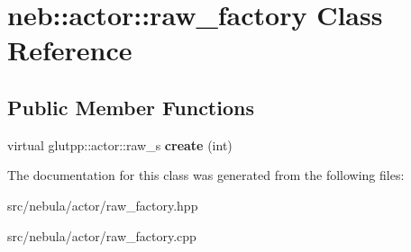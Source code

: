 \hypertarget{classneb_1_1actor_1_1raw__factory}{\section{neb\-:\-:actor\-:\-:raw\-\_\-factory \-Class \-Reference}
\label{classneb_1_1actor_1_1raw__factory}
}
\subsection*{\-Public \-Member \-Functions}
\begin{DoxyCompactItemize}
\item 
\hypertarget{classneb_1_1actor_1_1raw__factory_a2118b6982b4d59339bbb855e3beaaba9}{virtual glutpp\-::actor\-::raw\-\_\-s {\bfseries create} (int)}\label{classneb_1_1actor_1_1raw__factory_a2118b6982b4d59339bbb855e3beaaba9}

\end{DoxyCompactItemize}


\-The documentation for this class was generated from the following files\-:\begin{DoxyCompactItemize}
\item 
src/nebula/actor/raw\-\_\-factory.\-hpp\item 
src/nebula/actor/raw\-\_\-factory.\-cpp\end{DoxyCompactItemize}
